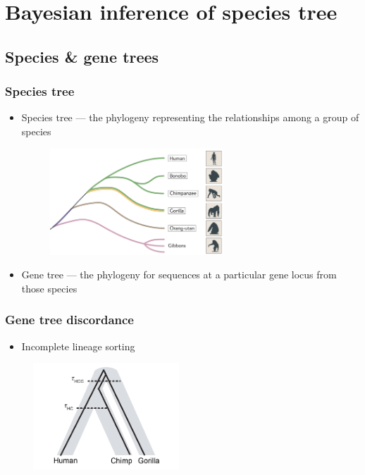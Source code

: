 \section{Bayesian inference of species tree}

\subsection{Species \& gene trees}

\begin{frame}\frametitle{Species tree}
	\begin{itemize}
		\item Species tree --- the phylogeny representing the relationships among a group of species
		\begin{figure}[h!]
 			\includegraphics[height=4cm]{figures/primateSpeciesTree}
		\end{figure}
		\item Gene tree --- the phylogeny for sequences at a particular gene locus from those species
	\end{itemize}
\end{frame}

\begin{frame}\frametitle{Gene tree discordance}
	\begin{itemize}
		\item Incomplete lineage sorting
	\end{itemize}
	\begin{figure}[h!]
 		\includegraphics[height=4cm]{figures/incompleteLineageSorting}
	\end{figure}
\end{frame}

